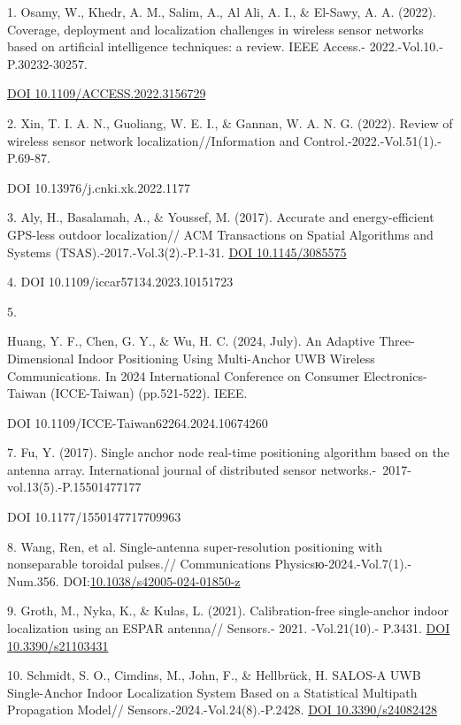 \begin{references}
1. Osamy, W., Khedr, A. M., Salim, A., Al Ali, A. I., \& El-Sawy, A. A.
(2022). Coverage, deployment and localization challenges in wireless
sensor networks based on artificial intelligence techniques: a review.
IEEE Access.- 2022.-Vol.10.-P.30232-30257.

\href{https://doi.org/10.1109/ACCESS.2022.3156729}{DOI
10.1109/ACCESS.2022.3156729}

2. Xin, T. I. A. N., Guoliang, W. E. I., \& Gannan, W. A. N. G. (2022).
Review of wireless sensor network localization//Information and
Control.-2022.-Vol.51(1).-P.69-87.

DOI 10.13976/j.cnki.xk.2022.1177

3. Aly, H., Basalamah, A., \& Youssef, M. (2017). Accurate and
energy-efficient GPS-less outdoor localization// ACM Transactions on
Spatial Algorithms and Systems (TSAS).-2017.-Vol.3(2).-P.1-31.
\href{https://doi.org/10.1145/3085575}{DOI 10.1145/3085575}

4.  DOI
10.1109/iccar57134.2023.10151723

5. 

Huang, Y. F., Chen, G. Y., \& Wu, H. C. (2024, July). An
Adaptive Three-Dimensional Indoor Positioning Using Multi-Anchor UWB
Wireless Communications. In 2024 International Conference on Consumer
Electronics-Taiwan (ICCE-Taiwan) (pp.521-522). IEEE.

DOI 10.1109/ICCE-Taiwan62264.2024.10674260

7. Fu, Y. (2017). Single anchor node real-time positioning algorithm
based on the antenna array. International journal of distributed sensor
networks.-~2017-vol.13(5).-P.15501477177

DOI 10.1177/1550147717709963

8. Wang, Ren, et al. Single-antenna super-resolution positioning with
nonseparable toroidal pulses.// Communications
Physicsю-2024.-Vol.7(1).-Num.356.
DOI:\href{http://dx.doi.org/10.1038/s42005-024-01850-z}{10.1038/s42005-024-01850-z}

9. Groth, M., Nyka, K., \& Kulas, L. (2021). Calibration-free
single-anchor indoor localization using an ESPAR antenna// Sensors.-
2021. -Vol.21(10).- P.3431. \href{https://doi.org/10.3390/s21103431}{DOI
10.3390/s21103431}

10. Schmidt, S. O., Cimdins, M., John, F., \& Hellbrück, H. SALOS-A UWB
Single-Anchor Indoor Localization System Based on a Statistical
Multipath Propagation Model// Sensors.-2024.-Vol.24(8).-P.2428.
\href{https://doi.org/10.3390/s24082428}{DOI 10.3390/s24082428}


\end{references}
